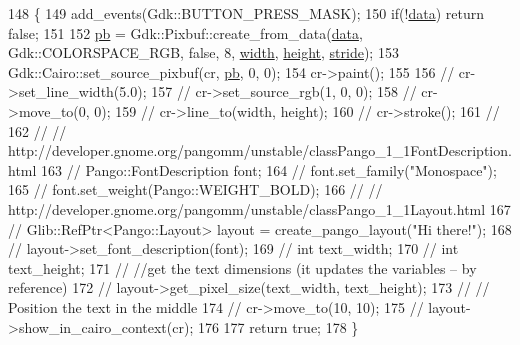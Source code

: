 \begin{DoxyCode}
148                                                            \{
149     add\_events(Gdk::BUTTON\_PRESS\_MASK);
150     \textcolor{keywordflow}{if}(!\hyperlink{class_image_view_aafc2f72cb5d3cbc5f23eb303b30982da}{data}) \textcolor{keywordflow}{return} \textcolor{keyword}{false};
151 
152     \hyperlink{class_image_view_aad080a9649488e9141f2ce0256dd4035}{pb} = Gdk::Pixbuf::create\_from\_data(\hyperlink{class_image_view_aafc2f72cb5d3cbc5f23eb303b30982da}{data}, Gdk::COLORSPACE\_RGB, \textcolor{keyword}{false}, 8, 
      \hyperlink{class_image_view_a5a491c5256173430d4b16d9abea80727}{width}, \hyperlink{class_image_view_a3e4a6ddf0a10ae710405cdd6e73924f6}{height}, \hyperlink{class_image_view_aee8be5a0041dbc9c04cdc439d08cc3df}{stride});
153     Gdk::Cairo::set\_source\_pixbuf(cr, \hyperlink{class_image_view_aad080a9649488e9141f2ce0256dd4035}{pb}, 0, 0);
154     cr->paint();
155 
156 \textcolor{comment}{//              cr->set\_line\_width(5.0);}
157 \textcolor{comment}{//              cr->set\_source\_rgb(1, 0, 0);}
158 \textcolor{comment}{//              cr->move\_to(0, 0);}
159 \textcolor{comment}{//              cr->line\_to(width, height);}
160 \textcolor{comment}{//              cr->stroke();}
161 \textcolor{comment}{//}
162 \textcolor{comment}{//              // http://developer.gnome.org/pangomm/unstable/classPango\_1\_1FontDescription.html}
163 \textcolor{comment}{//              Pango::FontDescription font;}
164 \textcolor{comment}{//              font.set\_family("Monospace");}
165 \textcolor{comment}{//              font.set\_weight(Pango::WEIGHT\_BOLD);}
166 \textcolor{comment}{//              // http://developer.gnome.org/pangomm/unstable/classPango\_1\_1Layout.html}
167 \textcolor{comment}{//              Glib::RefPtr<Pango::Layout> layout = create\_pango\_layout("Hi there!");}
168 \textcolor{comment}{//              layout->set\_font\_description(font);}
169 \textcolor{comment}{//              int text\_width;}
170 \textcolor{comment}{//              int text\_height;}
171 \textcolor{comment}{//              //get the text dimensions (it updates the variables -- by reference)}
172 \textcolor{comment}{//              layout->get\_pixel\_size(text\_width, text\_height);}
173 \textcolor{comment}{//              // Position the text in the middle}
174 \textcolor{comment}{//              cr->move\_to(10, 10);}
175 \textcolor{comment}{//              layout->show\_in\_cairo\_context(cr);}
176 
177     \textcolor{keywordflow}{return} \textcolor{keyword}{true};
178 \}
\end{DoxyCode}
\mbox{\label{class_image_view_a1c14fbed1a32a6f159c9916b6bd04d0a}} 
